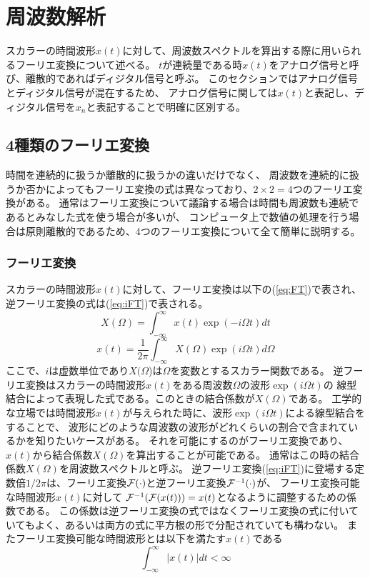 
\section{\mc 周波数解析}
スカラーの時間波形\(x(t)\)に対して、周波数スペクトルを算出する際に用いられるフーリエ変換について述べる。
\(t\)が連続量である時\(x(t)\)をアナログ信号と呼び、離散的であればディジタル信号と呼ぶ。
このセクションではアナログ信号とディジタル信号が混在するため、
アナログ信号に関しては\(x(t)\)と表記し、ディジタル信号を\(x_n\)と表記することで明確に区別する。
\subsection{4\mc 種類のフーリエ変換}
時間を連続的に扱うか離散的に扱うかの違いだけでなく、
周波数を連続的に扱うか否かによってもフーリエ変換の式は異なっており、\(2\times 2 = 4\)つのフーリエ変換がある。
通常はフーリエ変換について議論する場合は時間も周波数も連続であるとみなした式を使う場合が多いが、
コンピュータ上で数値の処理を行う場合は原則離散的であるため、4つのフーリエ変換について全て簡単に説明する。

\subsubsection{\mc フーリエ変換}
スカラーの時間波形\(x(t)\)に対して、フーリエ変換は以下の(\ref{eq:FT})で表され、
逆フーリエ変換の式は(\ref{eq:iFT})で表される。
\begin{equation}
    X(\Omega)=\int_{-\infty}^{\infty} x(t)\exp(-i\Omega t)dt
    \label{eq:FT}
\end{equation}
\begin{equation}
    x(t)=\frac{1}{2\pi} \int_{-\infty}^{\infty} X(\Omega)\exp(i\Omega t)d\Omega
    \label{eq:iFT}
\end{equation}
ここで、\(i\)は虚数単位であり\(X(\Omega\))は\(\Omega\)を変数とするスカラー関数である。
逆フーリエ変換はスカラーの時間波形\(x(t)\)をある周波数\(\Omega\)の波形\(\exp(i\Omega t)\)の
線型結合によって表現した式である。このときの結合係数が\(X(\Omega)\)である。
工学的な立場では時間波形\(x(t)\)が与えられた時に、波形\(\exp(i\Omega t)\)による線型結合をすることで、
波形にどのような周波数の波形がどれくらいの割合で含まれているかを知りたいケースがある。
それを可能にするのがフーリエ変換であり、\(x(t)\)から結合係数\(X(\Omega)\)を算出することが可能である。
通常はこの時の結合係数\(X(\Omega)\)を周波数スペクトルと呼ぶ。
逆フーリエ変換(\ref{eq:iFT})に登場する定数倍\(1/2\pi\)は、フーリエ変換\(\cal F(\cdot)\)と逆フーリエ変換\({\cal F}^{-1}(\cdot)\)が、
フーリエ変換可能な時間波形\(x(t)\)に対して
\({\cal F}^{-1}({\cal F}(x(t))) = x(t)\)となるように調整するための係数である。
この係数は逆フーリエ変換の式ではなくフーリエ変換の式に付いていてもよく、あるいは両方の式に平方根の形で分配されていても構わない。
またフーリエ変換可能な時間波形とは以下を満たす\(x(t)\)である
\begin{equation}
    \int_{-\infty}^{\infty}|x(t)|dt < \infty
\end{equation}

